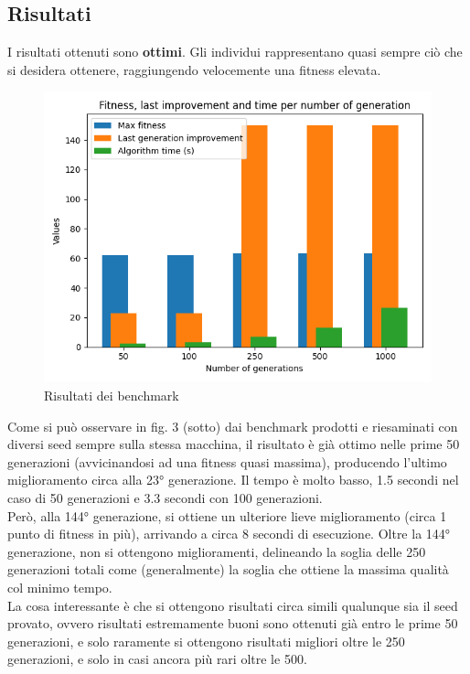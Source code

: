 \documentclass[12pt,titlepage]{article}
\begin{document}
\subsection {Risultati}

I risultati ottenuti sono \textbf{ottimi}. Gli individui rappresentano quasi sempre ciò che si desidera ottenere, raggiungendo velocemente una fitness elevata.\\

\begin{figure}
    \centering
    \includegraphics[width=0.75\linewidth]{assets/benchmark.png}
    \caption{Risultati dei benchmark}
\end{figure}

\noindent Come si può osservare in fig. 3 (sotto) dai benchmark prodotti e riesaminati con diversi seed sempre sulla stessa macchina, il risultato è già ottimo nelle prime 50 generazioni (avvicinandosi ad una fitness quasi massima), producendo l'ultimo miglioramento circa alla 23° generazione. Il tempo è molto basso, 1.5 secondi nel caso di 50 generazioni e 3.3 secondi con 100 generazioni.\\

\noindent Però, alla 144° generazione, si ottiene un ulteriore lieve miglioramento (circa 1 punto di fitness in più), arrivando a circa 8 secondi di esecuzione. Oltre la 144° generazione, non si ottengono miglioramenti, delineando la soglia delle 250 generazioni totali come (generalmente) la soglia che ottiene la massima qualità col minimo tempo.\\

\noindent La cosa interessante è che si ottengono risultati circa simili qualunque sia il seed provato, ovvero risultati estremamente buoni sono ottenuti già entro le prime 50 generazioni, e solo raramente si ottengono risultati migliori oltre le 250 generazioni, e solo in casi ancora più rari oltre le 500.\\
\end{document}
